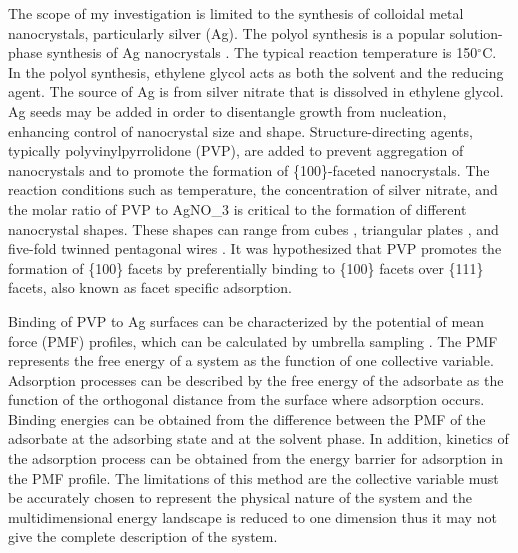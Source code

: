 
The scope of my investigation is limited to the synthesis of colloidal metal nanocrystals, particularly silver (Ag).
The polyol synthesis is a popular solution-phase synthesis of Ag nanocrystals \cite{Skrabalak_2007}.
The typical reaction temperature is 150$^{\circ}$C.
In the polyol synthesis, ethylene glycol acts as both the solvent and the reducing agent.
The source of Ag is from silver nitrate that is dissolved in ethylene glycol.
Ag seeds may be added in order to disentangle growth from nucleation, enhancing control of nanocrystal size and shape.
Structure-directing agents, typically polyvinylpyrrolidone (PVP), are added to prevent aggregation of nanocrystals and to promote the formation of \{100\}-faceted nanocrystals.
The reaction conditions such as temperature, the concentration of silver nitrate, and the molar ratio of PVP to AgNO_3 is critical to the formation of different nanocrystal shapes.
These shapes can range from cubes \cite{Xia_2012,Zhang_2010}, triangular plates \cite{Lofton_2005,Liu_2012}, and five-fold twinned pentagonal wires \cite{Zhu_2011,Zhang_2008,Sun_2002}.
It was hypothesized that PVP promotes the formation of \{100\} facets by preferentially binding to \{100\} facets over \{111\} facets\cite{Xia_2012,Sun_2002}, also known as facet specific adsorption.

Binding of PVP to Ag surfaces can be characterized by the potential of mean force (PMF) profiles, which can be calculated by umbrella sampling \cite{Torrie_1977,K_stner_2011}.
The PMF represents the free energy of a system as the function of one collective variable.
Adsorption processes can be described by the free energy of the adsorbate as the function of the orthogonal distance from the surface where adsorption occurs.
Binding energies can be obtained from the difference between the PMF of the adsorbate at the adsorbing state and at the solvent phase.
In addition, kinetics of the adsorption process can be obtained from the energy barrier for adsorption in the PMF profile.
The limitations of this method are the collective variable must be accurately chosen to represent the physical nature of the system and the multidimensional energy landscape is reduced to one dimension thus it may not give the complete description of the system.
  
  
  
  
  
  
  
  
  